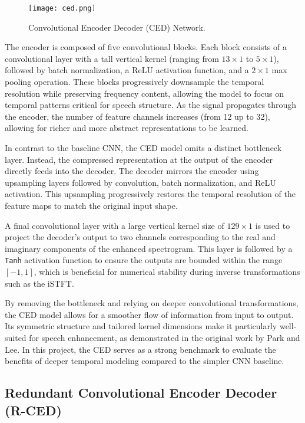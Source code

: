 \begin{figure}[h]
    \centering
    \texttt{[image: ced.png]}
    \caption{\label{fig:ced}Convolutional Encoder Decoder (CED) Network\cite{park2017acoustic}.}
\end{figure}

The encoder is composed of five convolutional blocks. Each block consists of a convolutional layer with a tall vertical kernel (ranging from \(13 \times 1\) to \(5 \times 1\)), followed by batch normalization, a ReLU activation function, and a \(2 \times 1\) max pooling operation. These blocks progressively downsample the temporal resolution while preserving frequency content, allowing the model to focus on temporal patterns critical for speech structure. As the signal propagates through the encoder, the number of feature channels increases (from 12 up to 32), allowing for richer and more abstract representations to be learned.

In contrast to the baseline CNN, the CED model omits a distinct bottleneck layer. Instead, the compressed representation at the output of the encoder directly feeds into the decoder. The decoder mirrors the encoder using upsampling layers followed by convolution, batch normalization, and ReLU activation. This upsampling progressively restores the temporal resolution of the feature maps to match the original input shape.

A final convolutional layer with a large vertical kernel size of \(129 \times 1\) is used to project the decoder’s output to two channels corresponding to the real and imaginary components of the enhanced spectrogram. This layer is followed by a \texttt{Tanh} activation function to ensure the outputs are bounded within the range \([-1, 1]\), which is beneficial for numerical stability during inverse transformations such as the iSTFT.

By removing the bottleneck and relying on deeper convolutional transformations, the CED model allows for a smoother flow of information from input to output. Its symmetric structure and tailored kernel dimensions make it particularly well-suited for speech enhancement, as demonstrated in the original work by Park and Lee. In this project, the CED serves as a strong benchmark to evaluate the benefits of deeper temporal modeling compared to the simpler CNN baseline.

\subsection{Redundant Convolutional Encoder Decoder (R-CED)}

